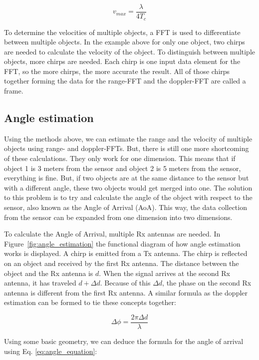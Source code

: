 \begin{equation}
v_{max} = \frac{\lambda}{4 T_c}
\label{eq:doppler_equation_max_speed}
\end{equation}

To determine the velocities of multiple objects, a FFT is used to differentiate between multiple objects. In the example above for only one object, two chirps are needed to calculate the velocity of the object. To distinguish between multiple objects, more chirps are needed. Each chirp is one input data element for the FFT, so the more chirps, the more accurate the result. All of those chirps together forming the data for the range-FFT and the doppler-FFT are called a frame. 

\subsection{Angle estimation}
Using the methods above, we can estimate the range and the velocity of multiple objects using range- and doppler-FFTs. But, there is still one more shortcoming of these calculations. They only work for one dimension. This means that if object 1 is 3 meters from the sensor and object 2 is 5 meters from the sensor, everything is fine. But, if two objects are at the same distance to the sensor but with a different angle, these two objects would get merged into one. The solution to this problem is to try and calculate the angle of the object with respect to the sensor, also known as the Angle of Arrival (AoA). This way, the data collection from the sensor can be expanded from one dimension into two dimensions.

To calculate the Angle of Arrival, multiple Rx antennas are needed. In Figure~\ref{fig:angle_estimation} the functional diagram of how angle estimation works is displayed. A chirp is emitted from a Tx antenna. The chirp is reflected on an object and received by the first Rx antenna. The distance between the object and the Rx antenna is $d$. When the signal arrives at the second Rx antenna, it has traveled $d + \Delta d$. Because of this $\Delta d$, the phase on the second Rx antenna is different from the first Rx antenna. A similar formula as the doppler estimation can be formed to tie these concepts together:

\begin{equation}
\Delta \phi = \frac{2 \pi \Delta d}{\lambda}
\label{eq:angle_equation}
\end{equation}

Using some basic geometry, we can deduce the formula for the angle of arrival using Eq. \ref{eq:angle_equation}:

